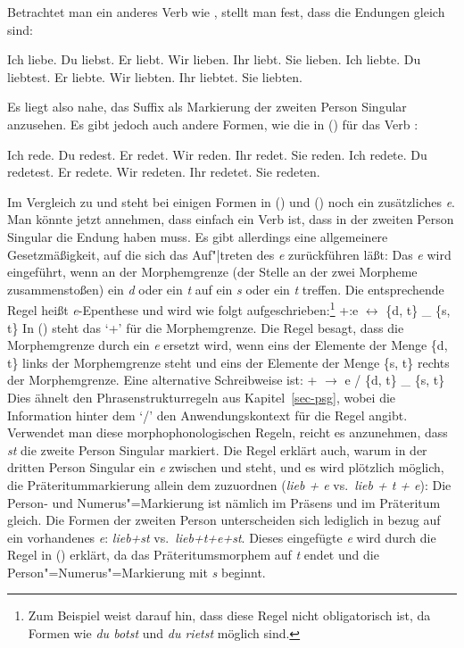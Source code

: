 \noindent
Betrachtet man ein anderes Verb wie \zb {}, stellt man fest, dass die
Endungen gleich sind:
\begin{multicols}{2}
\eal
\ex Ich liebe.
\ex Du  liebst.
\ex Er  liebt.
\ex Wir lieben.
\ex Ihr liebt.
\ex Sie lieben.
\zl
\eal
\ex Ich liebte.
\ex Du  liebtest.
\ex Er  liebte.
\ex Wir liebten.
\ex Ihr liebtet.
\ex Sie liebten.
\zl
\end{multicols}
\noindent
Es liegt also nahe, \zb das Suffix  als Markierung der zweiten Person Singular
anzusehen. Es gibt jedoch auch andere Formen, wie die in () für das Verb :
\begin{multicols}{2}
\eal
\ex Ich rede.
\ex Du  redest.
\ex Er  redet.
\ex Wir reden.
\ex Ihr redet.
\ex Sie reden.
\zl
\eal
\ex Ich redete.
\ex Du  redetest.
\ex Er  redete.
\ex Wir redeten.
\ex Ihr redetet.
\ex Sie redeten.
\zl
\end{multicols}
\noindent
Im Vergleich zu  und  steht bei einigen Formen in ()
und () noch ein zusätzliches \emph{e}. Man könnte jetzt annehmen, dass 
einfach ein Verb ist, dass in der zweiten Person Singular die Endung  haben
muss. Es gibt allerdings eine allgemeinere Gesetzmäßigkeit, auf die sich das Auf"|treten
des \emph{e} zurückführen läßt: Das \emph{e} wird eingeführt, wenn an der Morphemgrenze
(der Stelle an der zwei Morpheme zusammenstoßen) ein \emph{d} oder ein \emph{t} auf ein
\emph{s} oder ein \emph{t} treffen. Die entsprechende Regel heißt \emph{e}-Epenthese
und wird wie folgt aufgeschrieben:\footnote{
  Zum Beispiel \citet[]{Eisenberg98a} weist darauf hin, dass diese Regel nicht
  obligatorisch ist, da Formen wie \emph{du botst} und \emph{du rietst} möglich sind.%
}
\ea
\label{Regel-e-einfuegung}
+:e $\leftrightarrow$ \{d, t\} \_ \{s, t\}
\z
In () steht das `+' für die Morphemgrenze. Die Regel besagt, dass die Morphemgrenze
durch ein \emph{e} ersetzt wird, wenn eins der Elemente der Menge \{d, t\} links der Morphemgrenze
steht und eins der Elemente der Menge \{s, t\} rechts der Morphemgrenze.
Eine alternative Schreibweise ist:
\ea
+ $\to$ e / \{d, t\} \_ \{s, t\}
\z
Dies ähnelt den Phrasenstrukturregeln aus Kapitel~\ref{sec-psg}, wobei die Information hinter dem `/'
den Anwendungskontext für die Regel angibt. Verwendet man diese morphophonologischen Regeln,
reicht es anzunehmen, dass \emph{st} die zweite Person Singular markiert. Die Regel erklärt auch,
warum in der dritten Person Singular ein \emph{e} zwischen  und  steht,
und es wird plötzlich möglich, die Präteritummarkierung allein dem  zuzuordnen 
(\emph{lieb + e} vs.\ \emph{lieb + t + e}): Die Person- und
Numerus"=Markierung ist nämlich im Präsens und im Präteritum gleich. Die Formen der zweiten Person unterscheiden sich
lediglich in bezug auf ein vorhandenes \emph{e}: \emph{lieb+st} vs.\ \emph{lieb+t+e+st}. Dieses
eingefügte \emph{e} wird durch die Regel in () erklärt, da das Präteritumsmorphem
auf \emph{t} endet und die Person"=Numerus"=Markierung mit \emph{s} beginnt.

